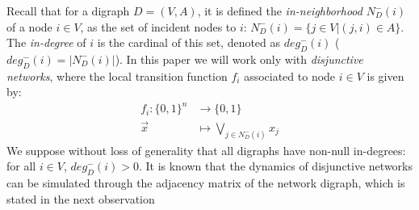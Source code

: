 \documentclass[preprint,12pt]{elsarticle}
\begin{document}
Recall that for a digraph $D=(V,A)$, it is defined the \textit{in-neighborhood} $N_D^-(i)$ of a node $i\in V$, as the set of incident nodes to $i$: $N_D^-(i)=\{j\in V|(j,i)\in A\}$. The \textit{in-degree} of $i$ is the cardinal of this set, denoted as $deg_D^-(i)$ ($deg_D^-(i)=|N_D^-(i)|$). In this paper we will work only with \textit{disjunctive networks}, %
where the %
local transition function%
 $f_i$ associated to node $i \in V$ is given by:  
\begin{align*}
f_i:\{0,1\}^n &\longrightarrow \{0,1\}\\
\vec{x} &\mapsto \bigvee_{j\in N_D^-(i)} x_j 
\end{align*} 
We suppose without loss of generality %
that all digraphs have non-null in-degrees: for all $i \in V$, $deg^{-}_D(i)>0$. %
It is known that the dynamics of disjunctive networks can be simulated through the adjacency matrix of the network digraph, which is stated in the next observation 
\end{document}
